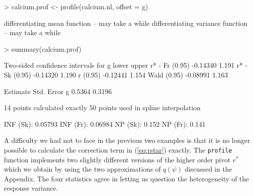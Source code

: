 \documentclass[a4paper,11pt]{article}
\def\code{\texttt}
\begin{document}
%
\begin{Schunk}
\begin{Sinput}
> calcium.prof <- profile(calcium.nl, offset = g)
\end{Sinput}
\begin{Soutput}
differentiating mean function -- may take a while
differentiating variance function -- may take a while
\end{Soutput}
\begin{Sinput}
> summary(calcium.prof)
\end{Sinput}
\begin{Soutput}
 Two-sided confidence intervals for g 
                  lower upper
r* - Fr (0.95) -0.14340 1.191
r* - Sk (0.95) -0.14320 1.190
r (0.95)       -0.12441 1.154
Wald (0.95)    -0.08991 1.163
                             
  Estimate Std. Error
g   0.5364     0.3196

14 points calculated exactly
50 points used in spline interpolation

INF (Sk): 0.05793
INF (Fr): 0.06984
NP (Sk): 0.152
NP (Fr): 0.141 
\end{Soutput}
\end{Schunk}
%
A difficulty we had not to face in the previous two examples is that it is no longer possible to calculate the correction term in (\ref{eq:rstar}) exactly.  The \code{profile} function implements two slightly different versions of the higher order pivot $r^*$ which we obtain by using the two approximations of $q(\psi)$ discussed in the Appendix.  The four statistics agree in letting us question the heterogeneity of the response variance.  
 
\end{document}

